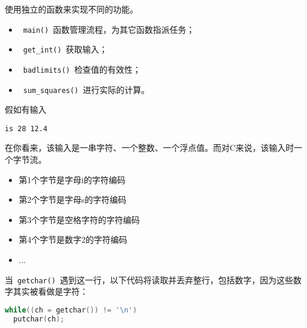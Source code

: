 \begin{frame}[fragile]
使用独立的函数来实现不同的功能。 \vspace{0.1in}

\begin{itemize}
\item \lstinline| main() |函数管理流程，为其它函数指派任务；\\[0.1in]
\item \lstinline| get_int() |获取输入；\\[0.1in]
\item \lstinline| badlimits() |检查值的有效性；\\[0.1in]
\item \lstinline| sum_squares() |进行实际的计算。

\end{itemize}
\end{frame}

\begin{frame}[fragile]
假如有输入
\begin{lstlisting}
is 28 12.4
\end{lstlisting}
在你看来，该输入是一串字符、一个整数、一个浮点值。而对C来说，该输入时一个字节流。\vspace{0.1in}

\begin{itemize}
\item 第1个字节是字母i的字符编码\\[0.1in]
\item 第2个字节是字母s的字符编码\\[0.1in]
\item 第3个字节是空格字符的字符编码\\[0.1in]
\item 第4个字节是数字2的字符编码\\[0.1in]
\item ...
\end{itemize}
\end{frame}

\begin{frame}[fragile]
当\lstinline| getchar() |遇到这一行，以下代码将读取并丢弃整行，包括数字，因为这些数字其实被看做是字符：
\begin{lstlisting}[language=c]
while((ch = getchar()) != '\n')
  putchar(ch);
\end{lstlisting}
\end{frame}

